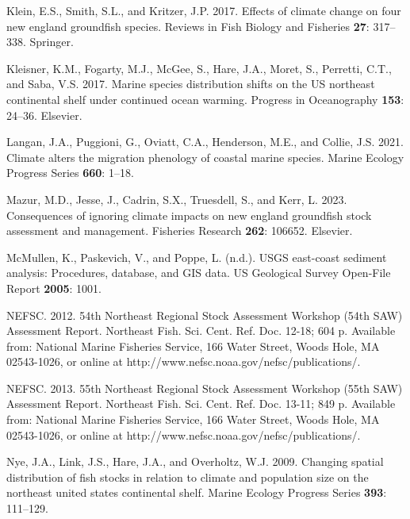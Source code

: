 \documentclass[
  12pt,
]{article}
\newlength{\cslhangindent}
\newlength{\cslentryspacingunit} %
\newenvironment{CSLReferences}[2] %
 {%
  \setlength{\parindent}{0pt}
  \ifodd #1
  \let\oldpar\par
  \def\par{\hangindent=\cslhangindent\oldpar}
  \fi
  \setlength{\parskip}{#2\cslentryspacingunit}
 }%
 {}
\begin{document}
\begin{CSLReferences}{1}{0}
\leavevmode{}%
Klein, E.S., Smith, S.L., and Kritzer, J.P. 2017. Effects of climate change on four new england groundfish species. Reviews in Fish Biology and Fisheries \textbf{27}: 317--338. Springer.

\leavevmode{}%
Kleisner, K.M., Fogarty, M.J., McGee, S., Hare, J.A., Moret, S., Perretti, C.T., and Saba, V.S. 2017. Marine species distribution shifts on the US northeast continental shelf under continued ocean warming. Progress in Oceanography \textbf{153}: 24--36. Elsevier.

\leavevmode{}%
Langan, J.A., Puggioni, G., Oviatt, C.A., Henderson, M.E., and Collie, J.S. 2021. Climate alters the migration phenology of coastal marine species. Marine Ecology Progress Series \textbf{660}: 1--18.

\leavevmode{}%
Mazur, M.D., Jesse, J., Cadrin, S.X., Truesdell, S., and Kerr, L. 2023. Consequences of ignoring climate impacts on new england groundfish stock assessment and management. Fisheries Research \textbf{262}: 106652. Elsevier.

\leavevmode{}%
McMullen, K., Paskevich, V., and Poppe, L. (n.d.). USGS east-coast sediment analysis: Procedures, database, and GIS data. US Geological Survey Open-File Report \textbf{2005}: 1001.

\leavevmode{}%
NEFSC. 2012. {54th Northeast Regional Stock Assessment Workshop (54th SAW) Assessment Report}. {Northeast Fish. Sci. Cent. Ref. Doc. 12-18; 604 p. Available from: National Marine Fisheries Service, 166 Water Street, Woods Hole, MA 02543-1026, or online at http://www.nefsc.noaa.gov/nefsc/publications/}.

\leavevmode{}%
NEFSC. 2013. {55th Northeast Regional Stock Assessment Workshop (55th SAW) Assessment Report}. {Northeast Fish. Sci. Cent. Ref. Doc. 13-11; 849 p. Available from: National Marine Fisheries Service, 166 Water Street, Woods Hole, MA 02543-1026, or online at http://www.nefsc.noaa.gov/nefsc/publications/}.

\leavevmode{}%
Nye, J.A., Link, J.S., Hare, J.A., and Overholtz, W.J. 2009. Changing spatial distribution of fish stocks in relation to climate and population size on the northeast united states continental shelf. Marine Ecology Progress Series \textbf{393}: 111--129.


\end{CSLReferences}
\end{document}
